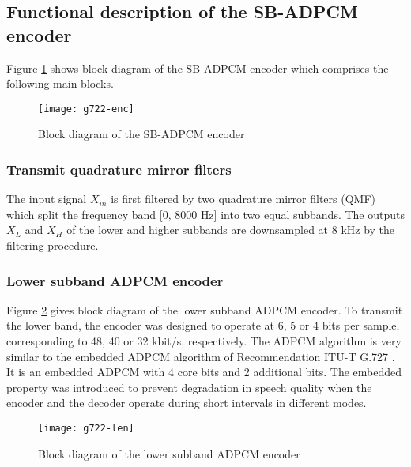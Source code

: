 \subsection{Functional description of the SB-ADPCM encoder}\label{G722:descr-encoder}

Figure \ref{G722:encoder} shows block diagram of the SB-ADPCM encoder
which comprises the following main blocks.

\begin{figure}
    \begin{center}
    \texttt{[image: g722-enc]}
  \end{center}
  \caption{Block diagram of the SB-ADPCM encoder
           \label{G722:encoder}}
\end{figure}

\subsubsection{Transmit quadrature mirror filters}

The input signal $X_{in}$ is first filtered by two quadrature mirror
filters (QMF) which split the frequency band [0, 8000 Hz] into two equal
subbands. The outputs $X_{L}$ and $X_{H}$ of the lower and higher subbands are downsampled at 8 kHz by the filtering procedure.


\subsubsection{Lower subband ADPCM encoder}

Figure \ref{G722:low-encoder} gives block diagram of the lower subband
ADPCM encoder. To transmit the lower band, the encoder was designed to
operate at 6, 5 or 4 bits per sample, corresponding to 48, 40 or 32
kbit/s, respectively. The ADPCM algorithm is very similar to the
embedded ADPCM algorithm of Recommendation ITU-T G.727
\cite{G.727}. It is an embedded ADPCM with 4 core bits and 2
additional bits. The embedded property was introduced to prevent
degradation in speech quality when the encoder and the decoder operate
during short intervals in different modes.

\begin{figure}
    \begin{center}
    \texttt{[image: g722-len]}
  \end{center}
  \caption{Block diagram of the lower subband ADPCM encoder
           \label{G722:low-encoder}}
\end{figure}

